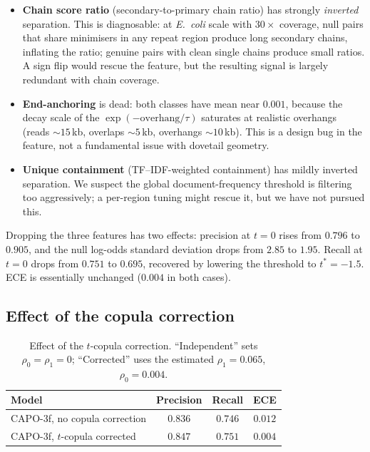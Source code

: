 \documentclass[11pt]{article}
\begin{document}
\begin{itemize}
    \item \textbf{Chain score ratio} (secondary-to-primary chain ratio)
    has strongly \emph{inverted} separation. This is diagnosable: at
    \textit{E.\ coli} scale with $30\times$ coverage, null pairs that
    share minimisers in any repeat region produce long secondary chains,
    inflating the ratio; genuine pairs with clean single chains produce
    small ratios. A sign flip would rescue the feature, but the resulting
    signal is largely redundant with chain coverage.
    \item \textbf{End-anchoring} is dead: both classes have mean near
    $0.001$, because the decay scale of the $\exp(-\text{overhang}/\tau)$
    saturates at realistic overhangs (reads $\sim 15$\,kb, overlaps
    $\sim 5$\,kb, overhangs $\sim 10$\,kb). This is a design bug in the
    feature, not a fundamental issue with dovetail geometry.
    \item \textbf{Unique containment} (TF--IDF-weighted containment) has
    mildly inverted separation. We suspect the global document-frequency
    threshold is filtering too aggressively; a per-region tuning might
    rescue it, but we have not pursued this.
\end{itemize}

Dropping the three features has two effects: precision at $t = 0$ rises
from $0.796$ to $0.905$, and the null log-odds standard deviation drops
from $2.85$ to $1.95$. Recall at $t = 0$ drops from $0.751$ to $0.695$,
recovered by lowering the threshold to $t^* = -1.5$. ECE is essentially
unchanged ($0.004$ in both cases).

\subsection{Effect of the copula correction}
\label{sec:copula-effect}

\begin{table}[h]
\centering
\caption{Effect of the $t$-copula correction. ``Independent'' sets
$\rho_0 = \rho_1 = 0$; ``Corrected'' uses the estimated $\rho_1 = 0.065$,
$\rho_0 = 0.004$.}
\label{tab:copula}
\begin{tabular}{lccc}
\toprule
Model & Precision & Recall & ECE \\
\midrule
CAPO-3f, no copula correction & $0.836$ & $0.746$ & $0.012$ \\
CAPO-3f, $t$-copula corrected & $0.847$ & $0.751$ & $\mathbf{0.004}$ \\
\bottomrule
\end{tabular}
\end{table}
\end{document}
